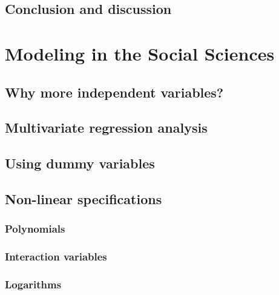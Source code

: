 \documentclass[
]{book}
\begin{document}
\hypertarget{conclusion-and-discussion-1}{%
\section{Conclusion and discussion}\label{conclusion-and-discussion-1}}

\hypertarget{ch:modeling}{%
\chapter{Modeling in the Social Sciences}\label{ch:modeling}}

\hypertarget{why-more-independent-variables}{%
\section{Why more independent variables?}\label{why-more-independent-variables}}

\hypertarget{multivariate-regression-analysis}{%
\section{Multivariate regression analysis}\label{multivariate-regression-analysis}}

\hypertarget{using-dummy-variables}{%
\section{Using dummy variables}\label{using-dummy-variables}}

\hypertarget{non-linear-specifications}{%
\section{Non-linear specifications}\label{non-linear-specifications}}

\hypertarget{polynomials}{%
\subsection{Polynomials}\label{polynomials}}

\hypertarget{interaction-variables}{%
\subsection{Interaction variables}\label{interaction-variables}}

\hypertarget{logarithms}{%
\subsection{Logarithms}\label{logarithms}}
\end{document}
